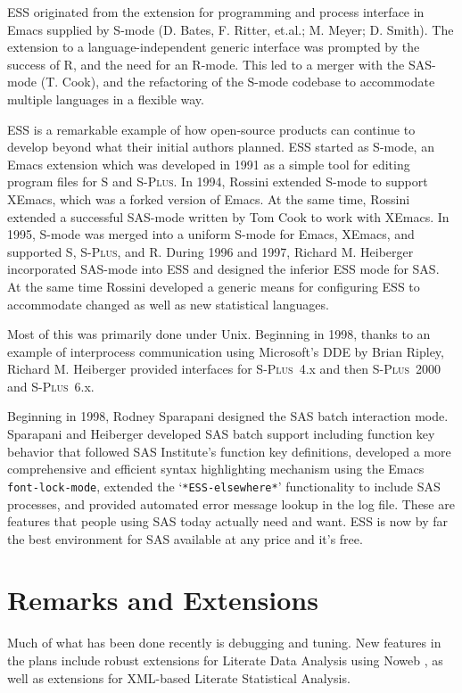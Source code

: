 \documentclass{article}
\newcommand*{\Splus}{\textsc{S-Plus}}
\newcommand{\stexttt}[1]{{\small\texttt{#1}}}
\newcommand{\file}[1]{`\stexttt{#1}'}
\begin{document}
ESS originated from the extension for programming and process
interface in Emacs supplied by S-mode (D. Bates, F. Ritter, et.al.; 
M. Meyer; D. Smith).  The extension to a language-independent generic
interface was prompted by the success of R, and the need for an
R-mode.  This led to a merger with the SAS-mode (T. Cook), and the
refactoring of the S-mode codebase to accommodate multiple languages
in a flexible way.

ESS is a remarkable example of how open-source products can continue
to develop beyond what their initial authors planned.  ESS started as
S-mode, an Emacs extension which was developed in 1991 as a simple
tool for editing program files for S and \Splus.  In 1994, Rossini
extended S-mode to support XEmacs, which was a forked version of
Emacs.  At the same time, Rossini extended a successful SAS-mode
written by Tom Cook to work with XEmacs.  In 1995, S-mode was merged
into a uniform S-mode for Emacs, XEmacs, and supported S, \Splus, and
R.  During 1996 and 1997, Richard M. Heiberger incorporated 
SAS-mode into ESS and designed the inferior ESS mode for SAS.
At the same time Rossini developed a
generic means for configuring ESS to accommodate changed as well as
new statistical languages.

Most of this was primarily done under Unix.  Beginning in 1998, thanks
to an example of interprocess communication using Microsoft's DDE by
Brian Ripley, Richard M. Heiberger provided interfaces for \Splus~4.x
and then \Splus~2000 and \Splus~6.x.  

Beginning in 1998, Rodney Sparapani designed the SAS batch interaction
mode.  Sparapani and Heiberger developed SAS batch support including
function key behavior that followed SAS Institute's function key
definitions,  developed a more comprehensive and efficient syntax
highlighting mechanism using the Emacs \stexttt{font-lock-mode},
extended the  \file{*ESS-elsewhere*} functionality to include SAS processes,
and provided  automated error message lookup in the log file.
These are features that people using SAS today
actually need and want.  ESS is now by far the best environment for
SAS available at any price and it's free.

\section{Remarks and Extensions}
\label{sec:remarks}

Much of what has been done recently is debugging and tuning.  New
features in the plans include robust extensions for Literate Data
Analysis using Noweb \citep{NRamsey:1994}, as well as extensions for
XML-based Literate Statistical Analysis.
\end{document}
